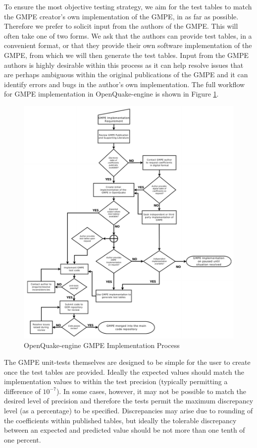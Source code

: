 To ensure the most objective testing strategy, we aim for the test tables 
to match the GMPE creator's own implementation of the GMPE, in as far as 
possible. Therefore we prefer to solicit input from the authors of the GMPE. 
This will often take one of two forms. We ask that the authors can provide 
test tables, in a convenient format, or that they provide their own software 
implementation of the GMPE, from which we will then generate the test tables.
Input from the GMPE authors is highly desirable within this process as it 
can help resolve issues that are perhaps ambiguous within the original
publications of the GMPE and it can identify errors and bugs in the 
author's own implementation. The full workflow for GMPE implementation 
in OpenQuake-engine is shown in Figure \ref{fig:gmpe_flowchart}.

\begin{figure}[htbp]
  \centering
  \includegraphics[width=\textwidth]{./qareport/pictures/gmpe_implementation_flowchart.pdf}
  \caption{OpenQuake-engine GMPE Implementation Process}
  \label{fig:gmpe_flowchart}
\end{figure}

The GMPE unit-tests themselves are designed to be simple for the user to
create once the test tables are provided. Ideally the expected values 
should match the implementation values to within the test precision 
(typically permitting a difference of $10^{-7}$).
In some cases, however, it may not be possible to match the desired level 
of precision and therefore the tests permit the maximum discrepancy level 
(as a percentage) to be specified. Discrepancies may arise due to rounding 
of the coefficients within published tables, but ideally the tolerable 
discrepancy between an expected and predicted value should be not more 
than one tenth of one percent.

